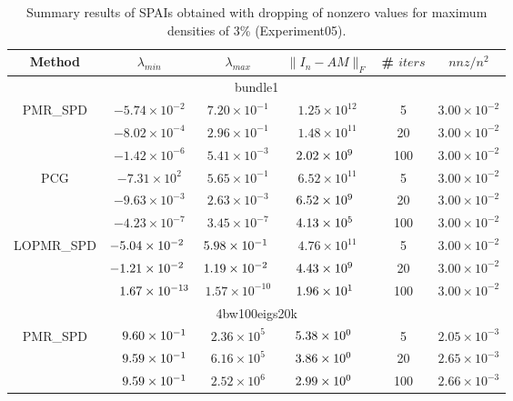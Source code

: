 \documentclass[numbers,webpdf,imanum]{ima-authoring-template}%
\theoremstyle{thmstyletwo}%
\numberwithin{equation}{section}
\begin{document}
\begin{table}
\caption{Summary results of SPAIs obtained with dropping of nonzero values for maximum densities of 3\% (Experiment05).}
\label{tab:with-dropping-summary-1}
\begin{tabular}{cccccc}
\toprule
Method & $\lambda_{min}$                   & $\lambda_{max}$                  & $\|I_n-AM\|_F$             &
\# $iters$ & $nnz/n^2$\\
\midrule
\multicolumn{6}{c}{bundle1}\\
\multirow{3}{*}{PMR\_SPD} 
& $-5.74\times 10^{-2}$ & $7.20\times 10^{-1}$ & $1.25\times 10^{12}$ & 5 & $3.00\times 10^{-2}$\\
& $-8.02\times 10^{-4}$ & $2.96\times 10^{-1}$ & $1.48\times 10^{11}$ & 20 & $3.00\times 10^{-2}$\\
& $-1.42\times 10^{-6}$ & $5.41\times 10^{-3}$ & $2.02\times 10^{9\hphantom{1}}$ & 100 & $3.00\times 10^{-2}$\\
\cmidrule{2-6}
\multirow{3}{*}{PCG} 
& $-7.31\times 10^{2}$ & $5.65\times 10^{-1}$ & $6.52\times 10^{11}$ & 5 & $3.00\times 10^{-2}$\\
& $-9.63\times 10^{-3}$ & $2.63\times 10^{-3}$ & $6.52\times 10^{9\hphantom{1}}$ & 20 & $3.00\times 10^{-2}$\\
& $-4.23\times 10^{-7}$ & $3.45\times 10^{-7}$ & $4.13\times 10^{5\hphantom{1}}$ & 100 & $3.00\times 10^{-2}$\\
\cmidrule{2-6}
\multirow{3}{*}{LOPMR\_SPD} 
& $-5.04\times 10^{-2\hphantom{1}}$ & $5.98\times 10^{-1\hphantom{1}}$ & $4.76\times 10^{11}$ & 5 & $3.00\times 10^{-2}$\\
& $-1.21\times 10^{-2\hphantom{1}}$ & $1.19\times 10^{-2\hphantom{0}}$ & $4.43\times 10^{9\hphantom{1}}$ & 20 & $3.00\times 10^{-2}$\\
& $\hphantom{-}1.67\times 10^{-13}$ & $1.57\times 10^{-10}$ & $1.96\times 10^{1\hphantom{1}}$ & 100 & $3.00\times 10^{-2}$\\
\midrule
\multicolumn{6}{c}{4bw100eigs20k}\\
\multirow{3}{*}{PMR\_SPD} 
& $\hphantom{-}9.60\times 10^{-1}$ & $2.36\times 10^{5}$ & $5.38\times 10^{0\hphantom{-}}$ & 5 & $2.05\times 10^{-3}$\\
& $\hphantom{-}9.59\times 10^{-1}$ & $6.16\times 10^{5}$ & $3.86\times 10^{0\hphantom{-}}$ & 20 & $2.65\times 10^{-3}$\\
& $\hphantom{-}9.59\times 10^{-1}$ & $2.52\times 10^{6}$ & $2.99\times 10^{0\hphantom{-}}$ & 100 & $2.66\times 10^{-3}$\\

\end{tabular}
\end{table}
\end{document}
